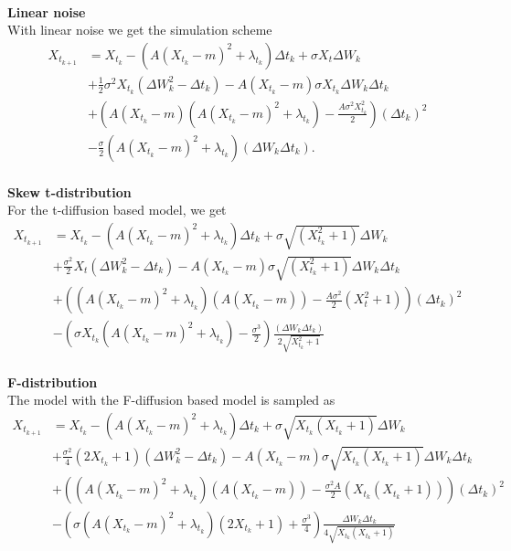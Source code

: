 \\
\textbf{Linear noise}\\
With linear noise we get the simulation scheme
\begin{align}
    X_{t_{k + 1}} &= X_{t_k} - \left(A(X_{t_k} - m)^2 + \lambda_{t_k}\right) \Delta t_k + \sigma X_t \Delta W_{k} \nonumber \\ &
    + \frac{1}{2}\sigma^2 X_{t_k}\left(\Delta W_{k}^2 - \Delta t_k\right) -A(X_{t_k} - m)\sigma X_{t_k} \Delta W_k\Delta t_k \nonumber\\
    & + \left(A\left(X_{t_k} - m\right)\left(A\left(X_{t_k} - m\right)^2 + \lambda_{t_k}\right) - \frac{A\sigma^2X_{t_k}^2}{2}\right)(\Delta t_k)^2 \nonumber \\
    &- \frac{\sigma}{2}\left(A\left(X_{t_k} - m\right)^2 + \lambda_{t_k}\right)\left(\Delta W_{k}\Delta t_k\right).
\end{align}
\\
\textbf{Skew t-distribution}\\
For the t-diffusion based model, we get
\begin{align}
    X_{t_{k + 1}} &= X_{t_k} - \left(A(X_{t_k} - m)^2 + \lambda_{t_k}\right) \Delta t_k + \sigma \sqrt{\left(X_{t_k}^2 + 1\right)} \Delta W_{k} \nonumber\\
    &+ \frac{\sigma^2}{2}X_t \left(\Delta W_{k}^2 - \Delta t_k\right) - A\left(X_{t_k} - m \right)\sigma\sqrt{\left(X_{t_k}^2 + 1\right)}\Delta W_{k}\Delta t_k \nonumber\\
    &+ \left(\left(A\left(X_{t_k} - m \right)^2+\lambda_{t_k}\right)\left(A\left(X_{t_k} - m \right)\right) - \frac{A\sigma^2}{2}\left(X_t^2 + 1\right)\right)\left(\Delta t_k\right)^2 \nonumber\\
    &-\left(\sigma X_{t_k}\left(A\left(X_{t_k} - m \right)^2 + \lambda_{t_k}\right) - \frac{\sigma^3}{2}\right)\frac{\left(\Delta W_{k}\Delta t_k\right)}{2\sqrt{X_{t_k}^2 + 1}} \label{eq:skew_t_sim}
\end{align} 
\\
\textbf{F-distribution}\\
The model with the F-diffusion based model is sampled as
\begin{align}
    X_{t_{k + 1}} &= X_{t_k} - \left(A(X_{t_k} - m)^2 + \lambda_{t_k}\right) \Delta t_k + \sigma\sqrt{X_{t_k}\left(X_{t_k} + 1\right)}\Delta W_k \nonumber \\
    &+ \frac{\sigma^2}{4}\left(2X_{t_k} + 1\right)\left(\Delta W_k^2 - \Delta t_k\right) - A \left(X_{t_k} - m\right)\sigma \sqrt{X_{t_k}\left(X_{t_k} + 1\right)}\Delta W_k \Delta t_k \nonumber \\
    &+ \left(\left(A\left(X_{t_k} - m\right)^2 + \lambda_{t_k}\right)\left(A\left(X_{t_k} - m\right)\right) - \frac{\sigma^2A}{2}\left(X_{t_k}\left(X_{t_k} + 1\right)\right)  \right)\left(\Delta t_k\right)^2 \nonumber \\
    &- \left(\sigma\left(A\left(X_{t_k} - m\right)^2 + \lambda_{t_k}\right)\left(2 X_{t_k} + 1\right) + \frac{\sigma^3}{4}\right)\frac{\Delta W_k \Delta t_k}{4\sqrt{X_{t_k}\left(X_{t_k} + 1\right)}}
\end{align}

